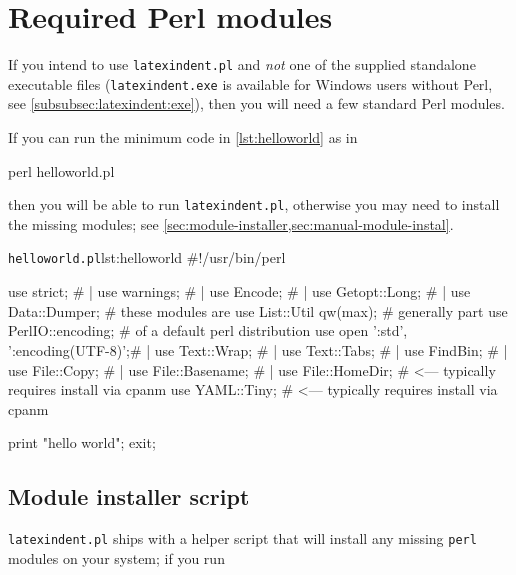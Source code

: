 \appendix
 \section{Required Perl modules}\label{sec:requiredmodules}
  If you intend to use \texttt{latexindent.pl} and \emph{not} one of the supplied
  standalone executable files (\texttt{latexindent.exe} is available for Windows users
  without Perl, see \cref{subsubsec:latexindent:exe}), then you will need a few standard
  Perl modules.

  If you can run the minimum code in \cref{lst:helloworld} as in

  \begin{commandshell}
perl helloworld.pl
  \end{commandshell}

  then you will be able to run \texttt{latexindent.pl}, otherwise you may need to install
  the missing modules; see \cref{sec:module-installer,sec:manual-module-instal}.

  \begin{cmhlistings}[style=tcblatex,language=Perl]{\texttt{helloworld.pl}}{lst:helloworld}
#!/usr/bin/perl

use strict;                         #     |
use warnings;                       #     |
use Encode;                         #     |
use Getopt::Long;                   #     |
use Data::Dumper;                   #  these modules are
use List::Util qw(max);             #  generally part
use PerlIO::encoding;               #  of a default perl distribution
use open ':std', ':encoding(UTF-8)';#     |
use Text::Wrap;                     #     |
use Text::Tabs;                     #     |
use FindBin;                        #     |
use File::Copy;                     #     |
use File::Basename;                 #     |
use File::HomeDir;                  # <--- typically requires install via cpanm
use YAML::Tiny;                     # <--- typically requires install via cpanm

print "hello world";
exit;
\end{cmhlistings}

 \subsection{Module installer script}\label{sec:module-installer}
   \texttt{latexindent.pl} ships with a
  helper script that will install any missing \texttt{perl} modules on your system; if you
  run

